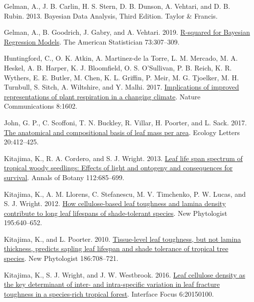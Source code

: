 \documentclass[
  12pt,
]{article}
\newlength{\cslhangindent}
\newlength{\cslentryspacingunit} %
\newenvironment{CSLReferences}[2] %
 {%
  \setlength{\parindent}{0pt}
  \ifodd #1
  \let\oldpar\par
  \def\par{\hangindent=\cslhangindent\oldpar}
  \fi
  \setlength{\parskip}{#2\cslentryspacingunit}
 }%
 {}
\begin{document}
\begin{CSLReferences}{1}{0}
\leavevmode{}%
Gelman, A., J. B. Carlin, H. S. Stern, D. B. Dunson, A. Vehtari, and D. B. Rubin. 2013. Bayesian {Data Analysis}, {Third Edition}. {Taylor \& Francis}.

\leavevmode{}%
Gelman, A., B. Goodrich, J. Gabry, and A. Vehtari. 2019. \href{https://doi.org/10.1080/00031305.2018.1549100}{R-squared for {Bayesian Regression Models}}. The American Statistician 73:307--309.

\leavevmode{}%
Huntingford, C., O. K. Atkin, A. Martinez-de la Torre, L. M. Mercado, M. A. Heskel, A. B. Harper, K. J. Bloomfield, O. S. O'Sullivan, P. B. Reich, K. R. Wythers, E. E. Butler, M. Chen, K. L. Griffin, P. Meir, M. G. Tjoelker, M. H. Turnbull, S. Sitch, A. Wiltshire, and Y. Malhi. 2017. \href{https://doi.org/10.1038/s41467-017-01774-z}{Implications of improved representations of plant respiration in a changing climate}. Nature Communications 8:1602.

\leavevmode{}%
John, G. P., C. Scoffoni, T. N. Buckley, R. Villar, H. Poorter, and L. Sack. 2017. \href{https://doi.org/10.1111/ele.12739}{The anatomical and compositional basis of leaf mass per area}. Ecology Letters 20:412--425.

\leavevmode{}%
Kitajima, K., R. A. Cordero, and S. J. Wright. 2013. \href{https://doi.org/10.1093/aob/mct036}{Leaf life span spectrum of tropical woody seedlings: Effects of light and ontogeny and consequences for survival}. Annals of Botany 112:685--699.

\leavevmode{}%
Kitajima, K., A. M. Llorens, C. Stefanescu, M. V. Timchenko, P. W. Lucas, and S. J. Wright. 2012. \href{https://doi.org/10.1111/j.1469-8137.2012.04203.x}{How cellulose-based leaf toughness and lamina density contribute to long leaf lifespans of shade-tolerant species}. New Phytologist 195:640--652.

\leavevmode{}%
Kitajima, K., and L. Poorter. 2010. \href{https://doi.org/10.1111/j.1469-8137.2010.03212.x}{Tissue-level leaf toughness, but not lamina thickness, predicts sapling leaf lifespan and shade tolerance of tropical tree species}. New Phytologist 186:708--721.

\leavevmode{}%
Kitajima, K., S. J. Wright, and J. W. Westbrook. 2016. \href{https://doi.org/10.1098/rsfs.2015.0100}{Leaf cellulose density as the key determinant of inter- and intra-specific variation in leaf fracture toughness in a species-rich tropical forest}. Interface Focus 6:20150100.


\end{CSLReferences}
\end{document}
